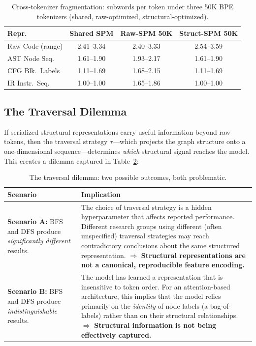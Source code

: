 \documentclass[pdflatex,sn-mathphys,Numbered]{sn-jnl}
\begin{document}
\begin{table}[tb]
\centering
\caption{Cross-tokenizer fragmentation: subwords per token under three 50K BPE tokenizers (shared, raw-optimized, structural-optimized).}\label{tab:indep-frag}
\begin{tabular}{lccc}
\toprule
Repr.\ & Shared SPM & Raw-SPM 50K & Struct-SPM 50K \\
\midrule
Raw Code (range) & 2.41--3.34 & 2.40--3.33 & 2.54--3.59 \\
AST Node Seq.   & 1.61--1.90 & 1.93--2.17 & 1.61--1.90 \\
CFG Blk.\ Labels & 1.11--1.69 & 1.68--2.15 & 1.11--1.69 \\
IR Instr.\ Seq.  & 1.00--1.00 & 1.65--1.86 & 1.00--1.00 \\
\bottomrule
\end{tabular}
\end{table}

\subsection{The Traversal Dilemma}
\label{sec:motive-trav}

If serialized structural representations carry useful information beyond raw tokens, then the traversal strategy $\tau$---which projects the graph structure onto a one-dimensional sequence---determines \emph{which} structural signal reaches the model. This creates a dilemma captured in Table~\ref{tab:dilemma}:

\begin{table}[tb]
\centering
\caption{The traversal dilemma: two possible outcomes, both problematic.}\label{tab:dilemma}
\begin{tabular}{p{3.5cm}p{8cm}}
\toprule
Scenario & Implication \\
\midrule
\textbf{Scenario A:} BFS and DFS produce \emph{significantly different} results. &
The choice of traversal strategy is a hidden hyperparameter that affects reported performance. Different research groups using different (often unspecified) traversal strategies may reach contradictory conclusions about the same structured representation. $\Rightarrow$ \textbf{Structural representations are not a canonical, reproducible feature encoding.} \\
\addlinespace
\textbf{Scenario B:} BFS and DFS produce \emph{indistinguishable} results. &
The model has learned a representation that is insensitive to token order. For an attention-based architecture, this implies that the model relies primarily on the \emph{identity} of node labels (a bag-of-labels) rather than on their structural relationships. $\Rightarrow$ \textbf{Structural information is not being effectively captured.} \\
\bottomrule
\end{tabular}
\end{table}
\end{document}
